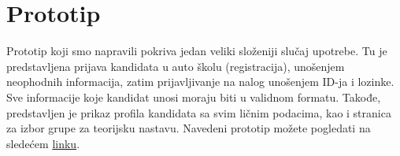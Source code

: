 \section{Prototip}
\label{sec:prototip}
Prototip koji smo napravili pokriva jedan veliki složeniji slučaj upotrebe.
Tu je pre\-dstavljena prijava kandidata u auto školu (registracija), unošenjem neophodnih informacija, zatim prijavljivanje na nalog
unošenjem ID-ja i lozinke. Sve informacije koje kandidat unosi moraju biti u validnom formatu. Takođe, predstavljen je prikaz profila kandidata sa svim ličnim podacima, kao i stranica za izbor grupe za teorijsku nastavu.  
Navedeni prototip možete pogledati na sledećem \href{https://github.com/tamarastojkovic/DRIVE-TO-SUCCEED/blob/main/Demo.rar}{linku}.


